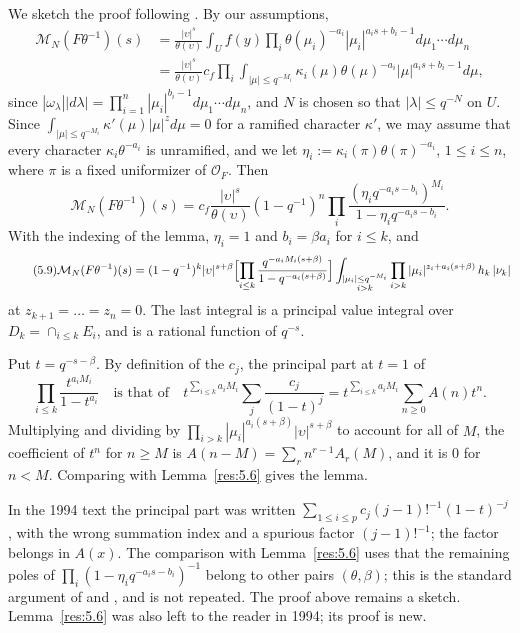 \documentclass[12pt,letterpaper]{amsart}
\theoremstyle{plain}
\theoremstyle{definition}
\theoremstyle{remark}
\theoremstyle{definition}
\begin{document}
We sketch the proof following \cite{La83}.
By our assumptions,
\begin{equation}\tag{5.8}\label{eq:5.8}
\begin{split}
\mathcal M_N (F\theta^{-1})(s)
&=\frac{|\upsilon|^s}{\theta(\upsilon)}
\int_Uf(y)\prod_i\theta(\mu_i)^{-a_i}|\mu_i|^{a_is+b_i-1}
d\mu_1\cdots d\mu_n\\
&=\frac{|\upsilon|^s}{\theta(\upsilon)}c_f
\prod_i\int_{|\mu|\leq q^{-M_i}}
\kappa_i(\mu)\theta(\mu)^{-a_i}|\mu|^{a_is+b_i-1}d\mu,
\end{split}
\end{equation}
since $|\omega_\lambda ||d\lambda |
=\prod_{i=1}^n|\mu_i|^{b_i-1}d\mu_1\cdots d\mu_n$, and $N$ is chosen so that
$|\lambda|\le q^{-N}$ on $U$.
Since
$\int_{|\mu|\leq q^{-M_i}}\kappa'(\mu)|\mu|^zd\mu =0$
for a ramified character $\kappa'$, we may assume
that every character $\kappa_i\theta^{-a_i}$
is unramified, and we let
$\eta_i:=\kappa_i(\pi)\theta(\pi)^{-a_i}$, $1\leq i\leq n$,
where $\pi$ is a fixed uniformizer of ${\mathcal O}_F$. Then
\[
\mathcal M_N (F\theta^{-1})(s)
=c_f\frac{|\upsilon|^s}{\theta(\upsilon)}
(1-q^{-1})^n\prod_i
\frac{(\eta_iq^{-a_is-b_i})^{M_i}}{1-\eta_iq^{-a_is-b_i}}.
\]
With the indexing of the lemma, $\eta_i=1$ and $b_i=\beta a_i$ for
$i\le k$, and
\begin{equation}\tag{5.9}\label{eq:5.9}
\mathcal M_N (F\theta^{-1})(s)
=(1-q^{-1})^k|\upsilon|^{s+\beta}\Bigl[\prod_{i\leq k}
\frac{q^{-a_iM_i(s+\beta)}}{1-q^{-a_i(s+\beta)}}\Bigr]
\int_{\substack{ |\mu_i|\leq q^{-M_i}\\ i>k}}
\prod_{i>k}|\mu_i|^{z_i+a_i(s+\beta)}\,h_k\,|\nu_k|
\end{equation}
at $z_{k+1}=\dots=z_n=0$. The last integral is a principal value
integral over $D_k=\cap_{i\leq k}E_i$, and is a rational function of
$q^{-s}$.

Put $t=q^{-s-\beta}$. By definition of the $c_j$, the principal part at
$t=1$ of
\[
\prod_{i\le k}\frac{t^{a_iM_i}}{1-t^{a_i}}
\quad\text{is that of}\quad
t^{\sum_{i\le k}a_iM_i}\sum_j\frac{c_j}{(1-t)^{j}}
=t^{\sum_{i\le k}a_iM_i}\sum_{n\geq 0}A(n)t^{n}.
\]
Multiplying and dividing by
$\prod_{i>k}|\mu_i|^{a_i(s+\beta)}|\upsilon|^{s+\beta}$ to account for all of
$M$, the coefficient of $t^n$ for $n\ge M$ is
$A(n-M)=\sum_rn^{r-1}A_r(M)$, and it is $0$ for $n<M$. Comparing with
Lemma~\ref{res:5.6} gives the lemma.

\begin{rem26}\label{rem:5.7}
In the 1994 text the principal part was written
$\sum_{1\leq i\leq p}c_j(j-1)!^{-1}(1-t)^{-j}$, with the wrong summation
index and a spurious factor $(j-1)!^{-1}$; the factor belongs in $A(x)$.
The comparison with Lemma~\ref{res:5.6} uses that the remaining poles of
$\prod_i(1-\eta_iq^{-a_is-b_i})^{-1}$ belong to other pairs $(\theta,\beta)$;
this is the standard argument of \cite{La83} and \cite{Ig78}, and is not
repeated. The proof above remains a sketch. Lemma~\ref{res:5.6} was also left
to the reader in 1994; its proof is new.
\end{rem26}
\end{document}
